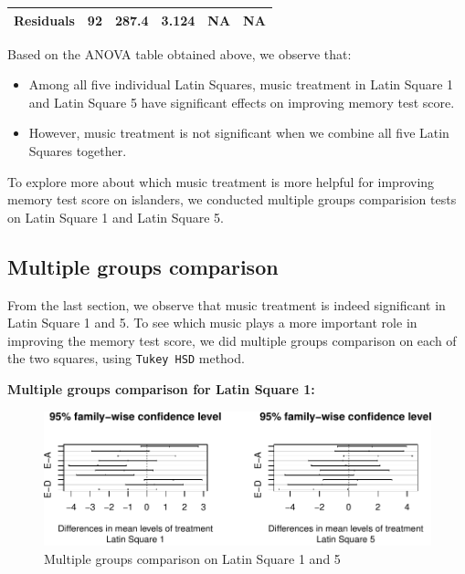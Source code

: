 \documentclass[]{article}
\providecommand{\tightlist}{%
  \setlength{\itemsep}{0pt}\setlength{\parskip}{0pt}}
\begin{document}
\begin{longtable}[]{@{}cccccc@{}}
\begin{minipage}[t]{0.19\columnwidth}
\textbf{Residuals}\strut
\end{minipage} & \begin{minipage}[t]{0.06\columnwidth}\centering\strut
92\strut
\end{minipage} & \begin{minipage}[t]{0.10\columnwidth}\centering\strut
287.4\strut
\end{minipage} & \begin{minipage}[t]{0.12\columnwidth}\centering\strut
3.124\strut
\end{minipage} & \begin{minipage}[t]{0.12\columnwidth}\centering\strut
NA\strut
\end{minipage} & \begin{minipage}[t]{0.12\columnwidth}\centering\strut
NA\strut
\end{minipage}\tabularnewline
\bottomrule
\end{longtable}

Based on the ANOVA table obtained above, we observe that:

\begin{itemize}
\tightlist
\item
  Among all five individual Latin Squares, music treatment in Latin
  Square 1 and Latin Square 5 have significant effects on improving
  memory test score.
\item
  However, music treatment is not significant when we combine all five
  Latin Squares together.
\end{itemize}

To explore more about which music treatment is more helpful for
improving memory test score on islanders, we conducted multiple groups
comparision tests on Latin Square 1 and Latin Square 5.

\subsection{Multiple groups
comparison}\label{multiple-groups-comparison}

From the last section, we observe that music treatment is indeed
significant in Latin Square 1 and 5. To see which music plays a more
important role in improving the memory test score, we did multiple
groups comparison on each of the two squares, using \texttt{Tukey\ HSD}
method.

\textbf{Multiple groups comparison for Latin Square 1:}

\begin{figure}
\centering
\includegraphics{STATS101B-Project_files/figure-latex/unnamed-chunk-10-1.pdf}
\caption{Multiple groups comparison on Latin Square 1 and 5}
\end{figure}
\end{document}
